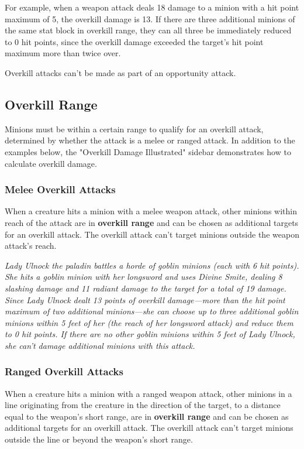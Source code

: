 \documentclass[10pt,a4paper,twoside,bg=print,twocolumn,openany,nodeprecatedcode]{dndbook}
\begin{document}
For example, when a weapon attack deals 18 damage to a minion with a hit point maximum of 5, the overkill damage is 13. If there are three additional minions of the same stat block in overkill range, they can all three be immediately reduced to 0 hit points, since the overkill damage exceeded the target's hit point maximum more than twice over.

Overkill attacks can't be made as part of an opportunity attack.

\subsection{Overkill Range}
Minions must be within a certain range to qualify for an overkill attack, determined by whether the attack is a melee or ranged attack. In addition to the examples below, the "Overkill Damage Illustrated" sidebar demonstrates how to calculate overkill damage.

\subsubsection{Melee Overkill Attacks}
When a creature hits a minion with a melee weapon attack, other minions within reach of the attack are in \textbf{overkill range} and can be chosen as additional targets for an overkill attack. The overkill attack can't target minions outside the weapon attack's reach.

\textit{Lady Ulnock the paladin battles a horde of goblin minions (each with 6 hit points). She hits a goblin minion with her longsword and uses Divine Smite, dealing 8 slashing damage and 11 radiant damage to the target for a total of 19 damage. Since Lady Ulnock dealt 13 points of overkill damage—more than the hit point maximum of two additional minions—she can choose up to three additional goblin minions within 5 feet of her (the reach of her longsword attack) and reduce them to 0 hit points. If there are no other goblin minions within 5 feet of Lady Ulnock, she can't damage additional minions with this attack.}

\subsubsection{Ranged Overkill Attacks}
When a creature hits a minion with a ranged weapon attack, other minions in a line originating from the creature in the direction of the target, to a distance equal to the weapon's short range, are in \textbf{overkill range} and can be chosen as additional targets for an overkill attack. The overkill attack can't target minions outside the line or beyond the weapon's short range.
\end{document}
